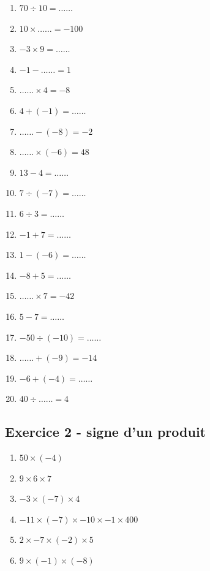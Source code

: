 \begin{multicols}{3}\noindent
    \begin{enumerate}
        \item $70 \div 10 = \ldots\ldots$
        \item $10 \times \ldots\ldots = -100$
        \item $-3 \times 9 = \ldots\ldots$
        \item $-1 - \ldots\ldots = 1$
        \item $\ldots\ldots \times 4 = -8$
        \item $4 + \left( -1\right) = \ldots\ldots$
        \item $\ldots\ldots - \left( -8\right) = -2$
        \item $\ldots\ldots \times \left( -6\right) = 48$
        \item $13 - 4 = \ldots\ldots$
        \item $7 \div \left( -7\right) = \ldots\ldots$
        \item $6 \div 3 = \ldots\ldots$
        \item $-1 + 7 = \ldots\ldots$
        \item $1 - \left( -6\right) = \ldots\ldots$
        \item $-8 + 5 = \ldots\ldots$
        \item $\ldots\ldots \times 7 = -42$
        \item $5 - 7 = \ldots\ldots$
        \item $-50 \div \left( -10\right) = \ldots\ldots$
        \item $\ldots\ldots + \left( -9\right) = -14$
        \item $-6 + \left( -4\right) = \ldots\ldots$
        \item $40 \div \ldots\ldots = 4$
    \end{enumerate}
  \end{multicols}

\subsection*{Exercice 2 - signe d'un produit}

\begin{enumerate}
        \item $50 \times (-4)$ \dotfill
        \item $9 \times 6 \times 7$ \dotfill
        \item $-3 \times (-7) \times 4$ \dotfill
        \item $-11 \times (-7) \times -10 \times -1 \times 400$ \dotfill
        \item $2 \times -7 \times (-2) \times 5$ \dotfill
        \item $9 \times (-1) \times (-8)$ \dotfill
\end{enumerate}

